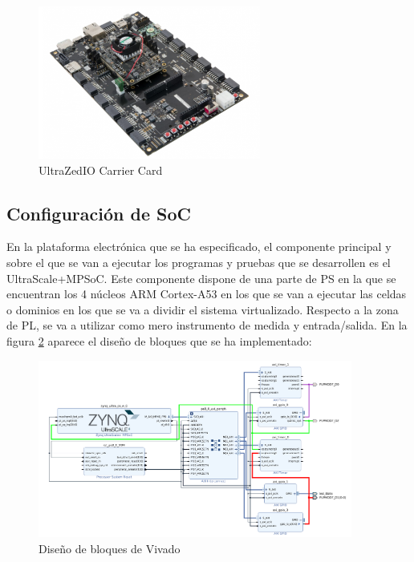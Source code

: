 \begin{figure}[h]
	\centering
	\includegraphics[width=0.65\textwidth]{recursos/ultrazed-eg-carrier.png}
	\caption{UltraZed\texttrademark IO Carrier Card}
	\label{fig:ultrazed-eg-carrier}
\end{figure}

\subsection{Configuración de SoC} \label{vivado_config}

En la plataforma electrónica que se ha especificado, el componente principal y sobre el que se van a ejecutar los programas y pruebas que se desarrollen es el UltraScale+\texttrademark MPSoC. Este componente dispone de una parte de \acrshort{PS} en la que se encuentran los 4 núcleos ARM Cortex-A53 en los que se van a ejecutar las celdas o dominios en los que se va a dividir el sistema virtualizado. Respecto a la zona de \acrshort{PL}, se va a utilizar como mero instrumento de medida y entrada/salida. En la figura \ref{fig:vivado_1} aparece el diseño de bloques que se ha implementado:\\

\begin{figure}[!h]
	\centering
	\includegraphics[angle=90,width=0.92\textwidth,height=0.92\textheight,keepaspectratio]{recursos/vivado_1.png}
	\caption{Diseño de bloques de Vivado}
	\label{fig:vivado_1}
\end{figure}

